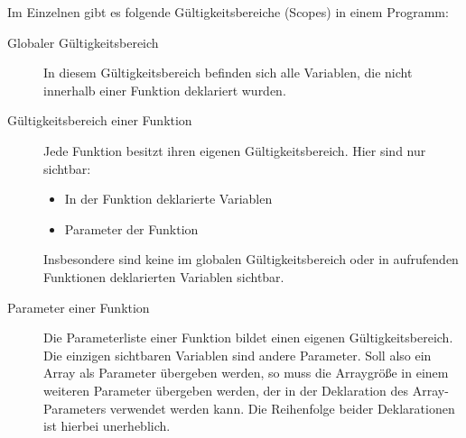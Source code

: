 Im Einzelnen gibt es folgende Gültigkeitsbereiche (Scopes) in einem Programm:

\begin{description}
	\item[Globaler Gültigkeitsbereich] In diesem Gültigkeitsbereich befinden sich alle Variablen, die nicht innerhalb einer Funktion deklariert wurden.
	\item[Gültigkeitsbereich einer Funktion] Jede Funktion besitzt ihren eigenen Gültigkeitsbereich. Hier sind nur sichtbar: \begin{itemize}
		\item In der Funktion deklarierte Variablen
		\item Parameter der Funktion
	\end{itemize}
	Insbesondere sind keine im globalen Gültigkeitsbereich oder in aufrufenden Funktionen deklarierten Variablen sichtbar.
	\item[Parameter einer Funktion] Die Parameterliste einer Funktion bildet einen eigenen Gültigkeitsbereich. Die einzigen sichtbaren Variablen sind andere Parameter. Soll also ein Array als Parameter übergeben werden, so muss die Arraygröße in einem weiteren Parameter übergeben werden, der in der Deklaration des Array-Parameters verwendet werden kann. Die Reihenfolge beider Deklarationen ist hierbei unerheblich.
\end{description}



